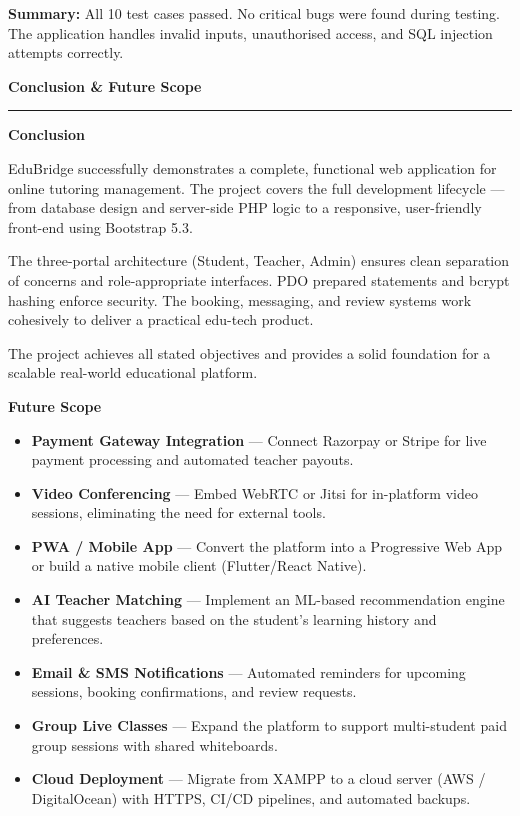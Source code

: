 \documentclass[12pt,a4paper]{report}
\begin{document}
\vspace{0.5cm}
\textbf{Summary:} All 10 test cases passed. No critical bugs were found during testing. The application handles invalid inputs, unauthorised access, and SQL injection attempts correctly.

\newpage
\thispagestyle{plain}
{\large\bfseries Conclusion \& Future Scope}\\[0.6pt]
\rule{\textwidth}{0.6pt}

\vspace{0.4cm}
\textbf{Conclusion}

\vspace{0.2cm}
EduBridge successfully demonstrates a complete, functional web application for online tutoring management. The project covers the full development lifecycle — from database design and server-side PHP logic to a responsive, user-friendly front-end using Bootstrap 5.3.

\vspace{0.3cm}
The three-portal architecture (Student, Teacher, Admin) ensures clean separation of concerns and role-appropriate interfaces. PDO prepared statements and bcrypt hashing enforce security. The booking, messaging, and review systems work cohesively to deliver a practical edu-tech product.

\vspace{0.3cm}
The project achieves all stated objectives and provides a solid foundation for a scalable real-world educational platform.

\vspace{0.6cm}
\textbf{Future Scope}

\begin{itemize}[leftmargin=1.5em, itemsep=4pt]
    \item \textbf{Payment Gateway Integration} — Connect Razorpay or Stripe for live payment processing and automated teacher payouts.
    \item \textbf{Video Conferencing} — Embed WebRTC or Jitsi for in-platform video sessions, eliminating the need for external tools.
    \item \textbf{PWA / Mobile App} — Convert the platform into a Progressive Web App or build a native mobile client (Flutter/React Native).
    \item \textbf{AI Teacher Matching} — Implement an ML-based recommendation engine that suggests teachers based on the student's learning history and preferences.
    \item \textbf{Email \& SMS Notifications} — Automated reminders for upcoming sessions, booking confirmations, and review requests.
    \item \textbf{Group Live Classes} — Expand the platform to support multi-student paid group sessions with shared whiteboards.
    \item \textbf{Cloud Deployment} — Migrate from XAMPP to a cloud server (AWS / DigitalOcean) with HTTPS, CI/CD pipelines, and automated backups.
\end{itemize}

\end{document}
